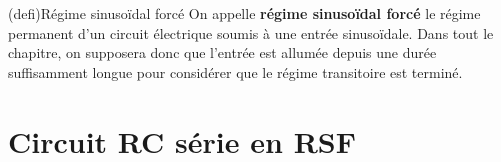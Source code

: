 \documentclass[../../main/main.tex]{subfiles}
\begin{document}
\begin{tcb}[label=def:rsf](defi){Régime sinusoïdal forcé}
	On appelle \textbf{régime sinusoïdal forcé} le régime permanent d'un circuit
	électrique soumis à une entrée sinusoïdale.
	\smallbreak
	Dans tout le chapitre, on supposera donc que l'entrée est allumée depuis une
	durée suffisamment longue pour considérer que le régime transitoire est
	terminé.
	\begin{center}
	\end{center}
\end{tcb}

\section{Circuit RC série en RSF}
\end{document}
